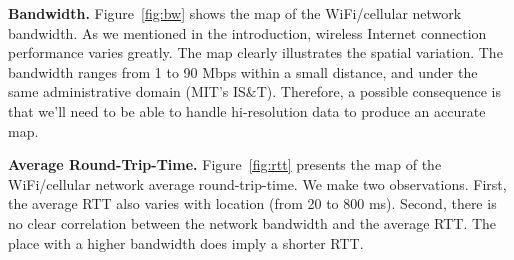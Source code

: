 {\bfseries Bandwidth.}
Figure~\ref{fig:bw} shows the map of the WiFi/cellular network bandwidth.
As we mentioned in the introduction, wireless Internet connection performance 
varies greatly. The map clearly illustrates the spatial variation. The bandwidth
ranges from 1 to 90 Mbps within a small distance, and under the same administrative
domain (MIT's IS\&T). Therefore, a possible consequence is that we'll need to 
be able to handle hi-resolution data to produce an accurate map.

{\bfseries Average Round-Trip-Time.}
Figure~\ref{fig:rtt} presents the map of the WiFi/cellular network average
round-trip-time. We make two observations. First, the average RTT also 
varies with location (from 20 to 800 ms). Second, there is no clear 
correlation between the network bandwidth and the average RTT. The place with a
higher bandwidth does imply a shorter RTT. 
